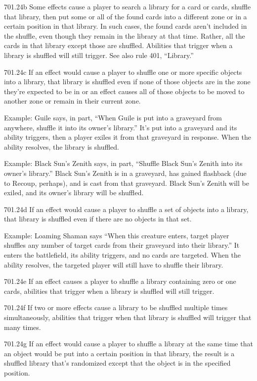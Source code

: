 701.24b Some effects cause a player to search a library for a card or cards, shuffle that library, then put some or all of the found cards into a different zone or in a certain position in that library. In such cases, the found cards aren’t included in the shuffle, even though they remain in the library at that time. Rather, all the cards in that library except those are shuffled. Abilities that trigger when a library is shuffled will still trigger. See also rule 401, “Library.”

701.24c If an effect would cause a player to shuffle one or more specific objects into a library, that library is shuffled even if none of those objects are in the zone they’re expected to be in or an effect causes all of those objects to be moved to another zone or remain in their current zone.

Example: Guile says, in part, “When Guile is put into a graveyard from anywhere, shuffle it into its owner’s library.” It’s put into a graveyard and its ability triggers, then a player exiles it from that graveyard in response. When the ability resolves, the library is shuffled.

Example: Black Sun’s Zenith says, in part, “Shuffle Black Sun’s Zenith into its owner’s library.” Black Sun’s Zenith is in a graveyard, has gained flashback (due to Recoup, perhaps), and is cast from that graveyard. Black Sun’s Zenith will be exiled, and its owner’s library will be shuffled.

701.24d If an effect would cause a player to shuffle a set of objects into a library, that library is shuffled even if there are no objects in that set.

Example: Loaming Shaman says “When this creature enters, target player shuffles any number of target cards from their graveyard into their library.” It enters the battlefield, its ability triggers, and no cards are targeted. When the ability resolves, the targeted player will still have to shuffle their library.

701.24e If an effect causes a player to shuffle a library containing zero or one cards, abilities that trigger when a library is shuffled will still trigger.

701.24f If two or more effects cause a library to be shuffled multiple times simultaneously, abilities that trigger when that library is shuffled will trigger that many times.

701.24g If an effect would cause a player to shuffle a library at the same time that an object would be put into a certain position in that library, the result is a shuffled library that’s randomized except that the object is in the specified position.

